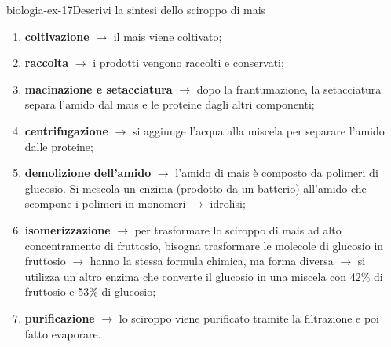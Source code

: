 \documentclass[preview]{standalone}
\begin{document}
\begin{snippetexercise}{biologia-ex-17}{Descrivi la sintesi dello sciroppo di mais}
    \begin{enumerate}
        \item \textbf{coltivazione} \(\rightarrow\) il mais viene coltivato;
        \item \textbf{raccolta} \(\rightarrow\) i prodotti vengono raccolti e conservati;
        \item \textbf{macinazione e setacciatura} \(\rightarrow\) dopo la frantumazione, la setacciatura separa l'amido dal mais e le
            proteine dagli altri componenti;
        \item \textbf{centrifugazione} \(\rightarrow\) si aggiunge l'acqua alla miscela per separare l'amido dalle proteine;
        \item \textbf{demolizione dell'amido} \(\rightarrow\) l'amido di mais è composto da polimeri di glucosio. Si mescola un enzima
            (prodotto da un batterio) all'amido che scompone i polimeri in monomeri \(\rightarrow\) idrolisi;
        \item \textbf{isomerizzazione} \(\rightarrow\) per trasformare lo sciroppo di mais ad alto concentramento di fruttosio, bisogna
            trasformare le molecole di glucosio in fruttosio \(\rightarrow\) hanno la stessa formula chimica, ma forma diversa \(\rightarrow\) si
            utilizza un altro enzima che converte il glucosio in una miscela con 42\% di fruttosio e 53\% di glucosio;
        \item \textbf{purificazione} \(\rightarrow\) lo sciroppo viene purificato tramite la filtrazione e poi fatto evaporare.
    \end{enumerate}
\end{snippetexercise}
\end{document}
